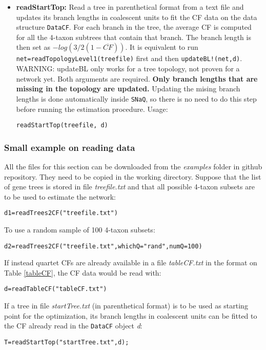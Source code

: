 \documentclass[12pt]{article}
\begin{document}
\begin{itemize}
\item \textbf{readStartTop:} Read a tree in parenthetical format from
  a text file and updates its branch lengths in coalescent units to
  fit the CF data on the data structure \texttt{DataCF}.  For each
  branch in the tree, the average CF is computed for all the 4-taxon
  subtrees that contain that branch. The branch length is then set as
  $-log(3/2(1-\overline{CF}))$. It is equivalent to run
  \texttt{net=readTopologyLevel1(treefile)} first and then \texttt{updateBL!(net,d)}.\\
  WARNING: updateBL only works for a tree topology, not proven for a
  network yet. Both arguments are required. \textbf{Only branch
    lengths that are missing in the topology are updated.}  Updating
  the mising branch lengths is done automatically inside
  \texttt{SNaQ}, so there is no need to do this step before running
  the estimation procedure.  Usage:
\begin{lstlisting}
readStartTop(treefile, d)
\end{lstlisting}

\end{itemize}

\subsubsection{Small example on reading data}
\label{readDataEx}
All the files for this section can be downloaded from the
\textit{examples} folder in github repository. They need to be copied
in the working directory.  Suppose that the list of gene trees is
stored in file \textit{treefile.txt} and that all possible 4-taxon
subsets are to be used to estimate the network:
\begin{lstlisting}
d1=readTrees2CF("treefile.txt")
\end{lstlisting}
To use a random sample of 100 4-taxon subsets:
\begin{lstlisting}
d2=readTrees2CF("treefile.txt",whichQ="rand",numQ=100)
\end{lstlisting}
If instead quartet CFs are already available in a file
\textit{tableCF.txt} in the format on Table \ref{tableCF}, the CF data
would be read with:
\begin{lstlisting}
d=readTableCF("tableCF.txt")
\end{lstlisting}
If a tree in file \textit{startTree.txt} (in parenthetical format) is
to be used as starting point for the optimization, its branch lengths
in coalescent units can be fitted to the CF already read in the
\texttt{DataCF} object \textit{d}:
\begin{lstlisting}
T=readStartTop("startTree.txt",d);
\end{lstlisting}
\end{document}
